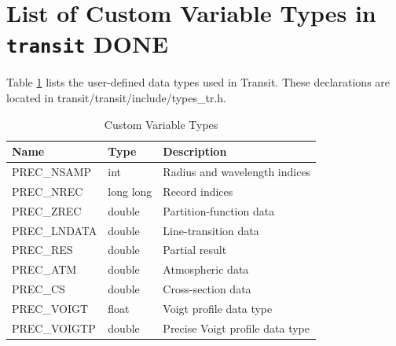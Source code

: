 \documentclass[letterpaper,12pt]{article}
\begin{document}
\pagebreak	
\section{List of Custom Variable Types in \texttt{transit} DONE}
\label{sec:variables}
Table \ref{table:types} lists the user-defined data types used in
Transit.  These declarations are located in
transit/transit/include/types\_tr.h.

\begin{table}[ht]
\centering
\caption{Custom Variable Types}
\label{table:types}
\begin{tabular}{lll}
\hline
\hline
Name         & Type      & Description \\
\hline
PREC\_NSAMP  & int       &  Radius and wavelength indices \\
PREC\_NREC   & long long &  Record indices \\
PREC\_ZREC   & double    &  Partition-function data \\
PREC\_LNDATA & double    &  Line-transition data  \\
PREC\_RES    & double    &  Partial result  \\
PREC\_ATM    & double    &  Atmospheric data  \\
PREC\_CS     & double    &  Cross-section data  \\
PREC\_VOIGT  & float     &  Voigt profile data type \\
PREC\_VOIGTP & double    &  Precise Voigt profile data type \\
\hline
\end{tabular}
\end{table}
\pagebreak
\end{document}
